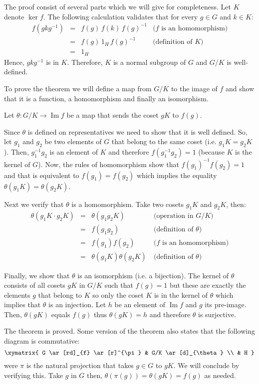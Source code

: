 \documentclass[12pt]{article}
\begin{document}
The proof consist of several parts which we will give for
completeness. Let $K$ denote $\ker f$. The following calculation
validates that for every $g\in G$ and $k \in K$:
\[
\begin{array}{llll}
  f(gkg^{-1}) &=& f(g) \, f(k) \, f(g)^{-1} & \text{($f$ is an homomorphism)}\\
  &=& f(g) \, 1_H \, f(g)^{-1} & \text{(definition of $K$)}\\
  &=& 1_H &
\end{array}
\]
Hence, $gkg^{-1}$ is in $K$. Therefore, $K$ is a normal subgroup
of $G$ and $G/K$ is well-defined.

To prove the theorem we will define a map from $G/K$ to the image
of $f$ and show that it is a function, a homomorphism and finally
an isomorphism.

Let $\theta\colon G/K \to \operatorname{Im} f$ be a map that sends the coset
$gK$ to $f(g)$.

Since $\theta$ is defined on representatives we need to show that
it is well defined. So, let $g_1$ and $g_2$ be two elements of $G$
that belong to the same coset (i.e. $g_1K = g_2K$). Then,
$g_1^{-1}g_2$ is an element of $K$ and therefore
$f(g_1^{-1}g_2)=1$ (because $K$ is the kernel of $G$). Now, the
rules of homomorphism show that $f(g_1)^{-1}f(g_2)=1$ and that is
equivalent to $f(g_1)=f(g_2)$ which implies the equality
$\theta(g_1K)=\theta(g_2K)$.

Next we verify that $\theta$ is a homomorphism. Take two cosets
$g_1K$ and $g_2K$, then:
\[
\begin{array}{llll}
  \theta (g_1K\cdot g_2K) &=& \theta(g_1g_2K) & \text{(operation in $G/K$)}\\
  &=& f(g_1g_2) & \text{(definition of $\theta$)}\\
  &=& f(g_1)f(g_2) & \text{($f$ is an homomorphism)}\\
  &=& \theta (g_1K)\theta (g_2K)\ & \text{(definition of $\theta$)}
\end{array}
\]

Finally, we show that $\theta$ is an isomorphism (i.e. a
bijection). The kernel of $\theta$ consists of all cosets $gK$ in
$G/K$ such that $f(g)=1$ but these are exactly the elements $g$
that belong to $K$ so only the coset $K$ is in the kernel of
$\theta$ which implies that $\theta$ is an injection. Let $h$
be an element of $\operatorname{Im} f$ and $g$ its pre-image. Then,
$\theta(gK)$ equals $f(g)$ thus $\theta(gK)=h$ and therefore
$\theta$ is surjective.

The theorem is proved. Some version of the theorem also states that
the following diagram is commutative:
\[
\xymatrix{
G \ar[rd]_{f} \ar[r]^{\pi} & G/K \ar[d]_{\theta} \\
& H }
\]
were $\pi$ is the natural projection that takes $g\in G$ to $gK$.
We will conclude by verifying this. Take $g$ in $G$ then,
$\theta(\pi(g))=\theta(gK)=f(g)$ as needed.
\end{document}
